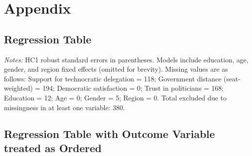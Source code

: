 \documentclass[11pt]{article}\usepackage[]{graphicx}\usepackage[]{xcolor}
\begin{document}
\clearpage






\setcounter{table}{0}
\renewcommand{\thetable}{A\arabic{table}}
\setcounter{figure}{0}
\renewcommand{\thefigure}{A\arabic{figure}}



\section{Appendix}
\setcounter{page}{1}


\subsection{Regression Table}

\begin{table}[!htbp]
\centering
\caption{OLS Estimates: Technocracy vs.\ Government Distance}
\label{tab:ols-models}
\resizebox{\textwidth}{!}{}
\par\vspace{0.5ex}
\footnotesize\emph{Notes:} HC1 robust standard errors in parentheses. Models include education, age, gender, and region fixed effects (omitted for brevity). Missing values are as follows: Support for technocratic delegation = 118; Government distance (seat-weighted) = 194; Democratic satisfaction = 0; Trust in politicians = 168; Education = 12; Age = 0; Gender = 5; Region = 0. Total excluded due to missingness in at least one variable: 380.
\end{table}


\newpage
\subsection{Regression Table with Outcome Variable treated as Ordered}
\FloatBarrier
\end{document}

